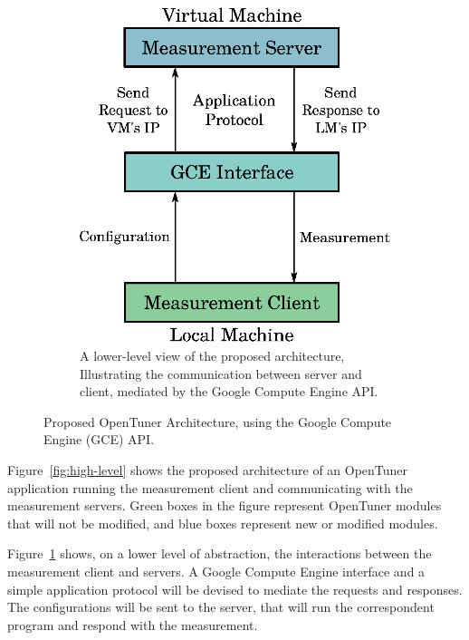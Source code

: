 \documentclass[a4paper, 12pt]{article}
\begin{document}
\begin{figure}[htpb]
\begin{subfigure}{.45\textwidth}
        \includegraphics[scale=.62]{low-level-implementation}
        \caption{A lower-level view of the proposed architecture,
        Illustrating the communication between server and client,
        mediated by the Google Compute Engine API.
        }
        \label{fig:low-level}
    \end{subfigure}%
    \caption{Proposed OpenTuner Architecture,
    using the Google Compute Engine (GCE) API.}
    \label{fig:archs}
\end{figure}

Figure~\ref{fig:high-level} shows the proposed architecture of an OpenTuner
application running the measurement client and communicating with the
measurement servers.  Green boxes in the figure represent OpenTuner modules
that will not be modified, and blue boxes represent new or modified modules.

Figure~\ref{fig:low-level} shows, on a lower level of abstraction, the
interactions between the measurement client and servers. A Google Compute
Engine interface and a simple application protocol will be devised to mediate
the requests and responses.  The configurations will be sent to the server,
that will run the correspondent program and respond with the measurement.
\end{document}
